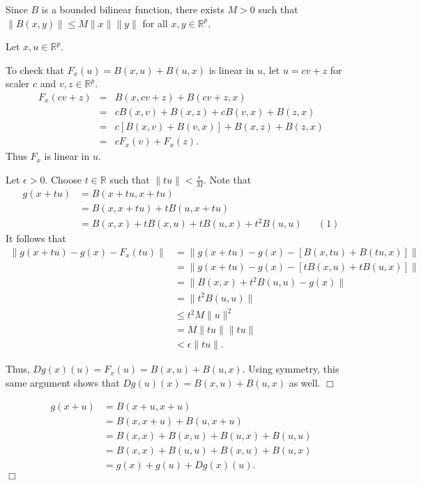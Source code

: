 \documentclass[11pt]{article}
\begin{document}
\vspace{.2in}

\noindent [proof]

 Since $B$ is a bounded bilinear function, there exists $M>0$ such that $\|B(x,y)\|\leq M\|x\|\|y\|$ for all $x,y\in\mathbb{R}^p$.
\vspace{.2in}

\noindent Let $x,u\in\mathbb{R}^p$.
\vspace{.2in}

\noindent {} To check that $F_x(u)=B(x,u)+B(u,x)$ is linear in $u$, let $u=cv+z$ for scaler $c$ and $v,z\in\mathbb{R}^p$.
\begin{eqnarray*}
F_x(cv+z)&=&B(x,cv+z)+B(cv+z,x)\\&=&cB(x,v)+B(x,z)+cB(v,x)+B(z,x)\\&=&c\left[B(x,v)+B(v,x)\right]+B(x,z)+B(z,x)\\&=&cF_x(v)+F_x(z).
\end{eqnarray*}
\noindent Thus $F_x$ is linear in $u$.

\vspace{.1in}

\noindent Let $\epsilon>0$. Choose $t\in\mathbb{R}$ such that $\|tu\|<\frac{\epsilon}{M}$. Note that
\begin{align*}
g(x+tu)&=B(x+tu,x+tu)\\&=B(x,x+tu)+tB(u,x+tu)\\&=B(x,x)+tB(x,u)+tB(u,x)+t^2B(u,u)&&(1)
\end{align*}
\noindent It follows that
\begin{align*}
\|g(x+tu)-g(x)-F_x(tu)\|&=\|g(x+tu)-g(x)-\left[B(x,tu)+B(tu,x)\right]\|\\&=\|g(x+tu)-g(x)-\left[tB(x,u)+tB(u,x)\right]\|\\&=\|B(x,x)+t^2B(u,u)-g(x)\|\\&=\|t^2B(u,u)\|\\&\leq t^2M\|u\|^2\\&=M\|tu\|\|tu\|\\&<\epsilon\|tu\|.
\end{align*}

\noindent Thus, $Dg(x)(u)=F_x(u)=B(x,u)+B(u,x)$. Using symmetry, this same argument shows that $Dg(u)(x)=B(x,u)+B(u,x)$ as well. \hfill $\Box$

\vspace{.1in}

\noindent {} \begin{align*}g(x+u)&=B(x+u,x+u)\\&=B(x,x+u)+B(u,x+u)\\&=B(x,x)+B(x,u)+B(u,x)+B(u,u)\\&=B(x,x)+B(u,u)+B(x,u)+B(u,x)\\&=g(x)+g(u)+Dg(x)(u).
\end{align*}
\hfill $\Box$
\end{document}
